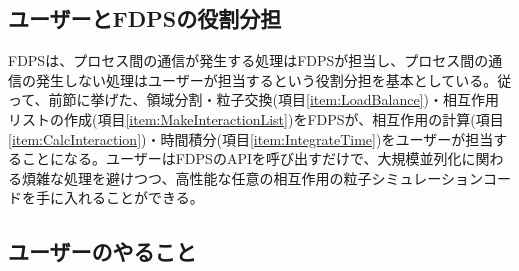 
\subsection{ユーザーとFDPSの役割分担}

FDPSは、プロセス間の通信が発生する処理はFDPSが担当し、プロセス間の通信の発生しない処理はユーザーが担当するという役割分担を基本としている。従って、前節に挙げた、領域分割・粒子交換(項目\ref{item:LoadBalance})・相互作用リストの作成(項目\ref{item:MakeInteractionList})をFDPSが、相互作用の計算(項目\ref{item:CalcInteraction})・時間積分(項目\ref{item:IntegrateTime})をユーザーが担当することになる。ユーザーはFDPSのAPIを呼び出すだけで、大規模並列化に関わる煩雑な処理を避けつつ、高性能な任意の相互作用の粒子シミュレーションコードを手に入れることができる。

\subsection{ユーザーのやること}
\label{subsec:things_to_do_by_users}

